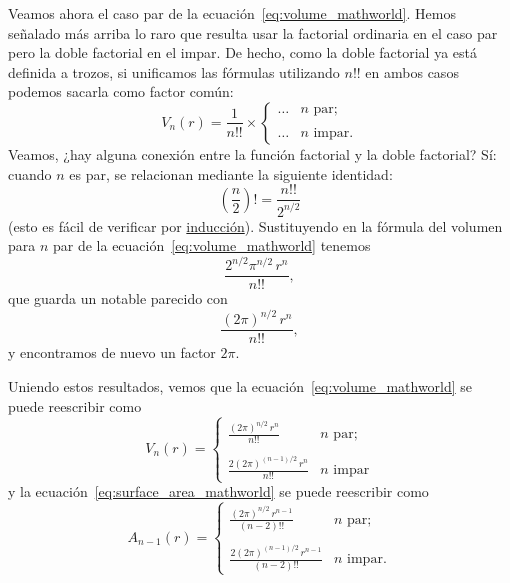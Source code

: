 Veamos ahora el caso par de la ecuación~\eqref{eq:volume_mathworld}. Hemos señalado más arriba lo raro que resulta usar la factorial ordinaria en el caso par pero la doble factorial en el impar. De hecho, como la doble factorial ya está definida a trozos, si unificamos las fórmulas utilizando $n!!$ en ambos casos podemos sacarla como factor común:
\[
V_n(r) = \frac{1}{n!!}\times \begin{cases}
\ldots & n \text{ par}; \\ \\
 \ldots & n \text{ impar}.
 \end{cases}
\]
Veamos, ¿hay alguna conexión entre la función factorial y la doble factorial? Sí: cuando $n$ es par, se relacionan mediante la siguiente identidad:
\[ \left(\frac{n}{2}\right)! = \frac{n!!}{2^{n/2}} \]
(esto es fácil de verificar por \href{https://es.wikipedia.org/wiki/Inducción_matemática}{inducción}). Sustituyendo en la fórmula del volumen para $n$ par de la ecuación~\eqref{eq:volume_mathworld} tenemos
\[ \frac{2^{n/2}\pi^{n/2}\,r^n}{n!!}, \]
que guarda un notable parecido con
\[ \frac{(2\pi)^{n/2}\,r^n}{n!!}, \]
y encontramos de nuevo un factor $2\pi$.

Uniendo estos resultados, vemos que la ecuación~\eqref{eq:volume_mathworld} se puede reescribir como
\begin{equation}
\label{eq:volume_2pi}
V_n(r) = \begin{cases}
 \displaystyle \frac{(2\pi)^{n/2}\,r^n}{n!!} & n \text{ par}; \\ \\
 \displaystyle \frac{2(2\pi)^{(n-1)/2}\,r^n}{n!!} & n \text{ impar}
 \end{cases}
\end{equation}
y la ecuación~\eqref{eq:surface_area_mathworld} se puede reescribir como
\begin{equation}
\label{eq:surface_area_2pi}
A_{n-1}(r) = \begin{cases}
\displaystyle \frac{(2\pi)^{n/2}\,r^{n-1}}{(n-2)!!} & n \text{ par}; \\ \\
\displaystyle \frac{2(2\pi)^{(n-1)/2}\,r^{n-1}}{(n-2)!!} & n \text{ impar}.
\end{cases}
\end{equation}

